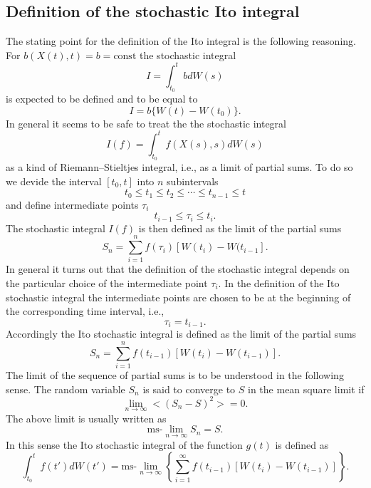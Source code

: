 \subsection{Definition of the stochastic Ito integral}
The stating point for the definition of the Ito integral is the
following reasoning. For $b(X(t),t)=b=\text{const}$ the stochastic 
integral
\begin{equation*}
I = \int_{t_0}^t bdW(s)
\end{equation*}
is expected to be defined and to be equal to
\begin{equation*}
I = b \{ W(t) - W(t_0) \}.
\end{equation*}
In general it seems to be safe to treat the the stochastic 
integral 
\begin{equation*}
I(f) = \int_{t_0}^t f(X(s),s) dW(s)
\end{equation*}
as a kind of Riemann--Stieltjes integral, i.e., as a limit of 
partial sums. To do so we devide the interval $[t_0,t]$ into $n$
subintervals
\begin{equation*}
t_0 \le t_1 \le t_2 \le \cdots \le t_{n-1} \le t
\end{equation*}
and define intermediate points $\tau_i$
\begin{equation*}
t_{i-1} \le \tau_i \le t_i.
\end{equation*}
The stochastic integral $I(f)$ is then defined as the limit
of the partial sums
\begin{equation*}
S_n = \sum_{i=1}^n f(\tau_i) \left[  W(t_i) - W(t_{i-1} \right].
\end{equation*}
In general it turns out that the definition of the stochastic 
integral depends on the particular choice of the intermediate 
point $\tau_i$. In the definition of the Ito stochastic integral
the intermediate points are chosen to be at the beginning of
the corresponding time interval, i.e.,
\begin{equation*}
\tau_i = t_{i-1}.
\end{equation*}
Accordingly the Ito stochastic integral is defined as the limit of 
the partial sums
\begin{equation*}
S_n = \sum_{i=1}^n f(t_{i-1}) [  W(t_i) - W(t_{i-1}) ].
\end{equation*}
The limit of the sequence of partial sums is to be understood in the
following sense. The random variable $S_n$ is said to converge to $S$
 in the mean square limit if
\begin{equation*}
\lim_{n \rightarrow \infty}
 <(S_n -S)^2> =0.
\end{equation*}
The above limit is usually written as
\begin{equation*}
\text{ms-} \lim_{n \rightarrow \infty} S_n = S.
\end{equation*}
In this sense the Ito stochastic integral of the function $g(t)$ is
defined as
\begin{equation*}
\int_{t_0}^t f(t') dW(t') = \text{ms-}\lim_{n \rightarrow \infty}
   \left\{ \sum_{i=1}^{\infty} f(t_{i-1}) [W(t_i) - W(t_{i-1})]   \right\}.
\end{equation*}

